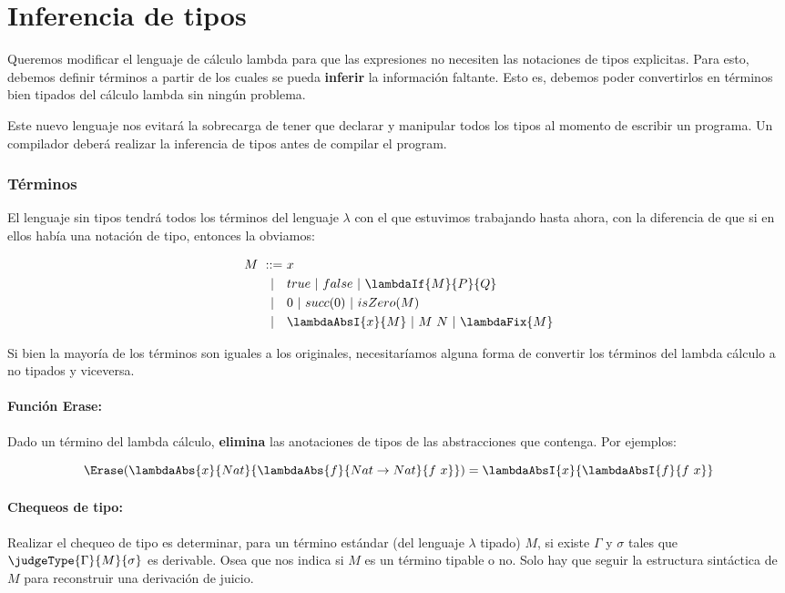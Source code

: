 \section{Inferencia de tipos}
Queremos modificar el lenguaje de cálculo lambda para que las expresiones no necesiten las notaciones de tipos explicitas. Para esto, debemos definir términos a partir de los cuales se pueda \textbf{inferir} la información faltante. Esto es, debemos poder convertirlos en términos bien tipados del cálculo lambda sin ningún problema.

Este nuevo lenguaje nos evitará la sobrecarga de tener que declarar y manipular todos los tipos al momento de escribir un programa. Un compilador deberá realizar la inferencia de tipos antes de compilar el program.

\subsubsection*{Términos}
El lenguaje sin tipos tendrá todos los términos del lenguaje $\lambda$ con el que estuvimos trabajando hasta ahora, con la diferencia de que si en ellos había una notación de tipo, entonces la obviamos:

\begin{equation*}
	\begin{split}
		M~::=~&x \\
		|~~~&true~|~false~|~\lambdaIf{M}{P}{Q} \\
		|~~~&0~|~succ(0)~|~isZero(M) \\
		|~~~& \lambdaAbsI{x}{M}~|~M~N~|~\lambdaFix{M}
	\end{split}
\end{equation*}

Si bien la mayoría de los términos son iguales a los originales, necesitaríamos alguna forma de convertir los términos del lambda cálculo a no tipados y viceversa. 

\paragraph{Función Erase:} Dado un término del lambda cálculo, \textbf{elimina} las anotaciones de tipos de las abstracciones que contenga. Por ejemplos: 

$$\Erase(\lambdaAbs{x}{Nat}{\lambdaAbs{f}{Nat\to Nat}{f~x}}) = \lambdaAbsI{x}{\lambdaAbsI{f}{f~x}}$$

\paragraph{Chequeos de tipo:}
Realizar el chequeo de tipo es determinar, para un término estándar (del lenguaje $\lambda$ tipado) $M$, si existe $\Gamma$ y $\sigma$ tales que $\judgeType{\Gamma}{M}{\sigma}$ es derivable. Osea que nos indica si $M$ es un término tipable o no. Solo hay que seguir la estructura sintáctica de $M$ para reconstruir una derivación de juicio. 


